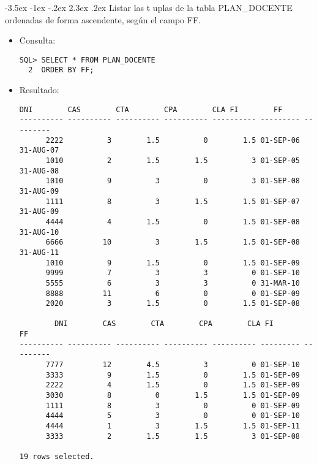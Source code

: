 \documentclass[11pt]{report}
\makeatletter
\renewcommand\chapter{\@startsection{chapter}{0}{\z@}%
    {-3.5ex \@plus -1ex \@minus -.2ex}%
    {2.3ex \@plus.2ex}%
    {\normalfont\Large\bfseries}}
\makeatother
\begin{document}
\newpage

\chapter{Listar las t uplas de la tabla PLAN\_DOCENTE ordenadas de forma ascendente, según el campo FF.}
\begin{itemize}
  \item Consulta:
  \begin{verbatim}
SQL> SELECT * FROM PLAN_DOCENTE
  2  ORDER BY FF;
  \end{verbatim}
  \item{Resultado:}
  \begin{verbatim}
DNI        CAS        CTA        CPA        CLA FI        FF             
---------- ---------- ---------- ---------- ---------- --------- ---------      
      2222          3        1.5          0        1.5 01-SEP-06 31-AUG-07      
      1010          2        1.5        1.5          3 01-SEP-05 31-AUG-08      
      1010          9          3          0          3 01-SEP-08 31-AUG-09      
      1111          8          3        1.5        1.5 01-SEP-07 31-AUG-09      
      4444          4        1.5          0        1.5 01-SEP-08 31-AUG-10      
      6666         10          3        1.5        1.5 01-SEP-08 31-AUG-11      
      1010          9        1.5          0        1.5 01-SEP-09                
      9999          7          3          3          0 01-SEP-10                
      5555          6          3          3          0 31-MAR-10                
      8888         11          6          0          0 01-SEP-09                
      2020          3        1.5          0        1.5 01-SEP-08                

        DNI        CAS        CTA        CPA        CLA FI        FF             
---------- ---------- ---------- ---------- ---------- --------- ---------      
      7777         12        4.5          3          0 01-SEP-10                
      3333          9        1.5          0        1.5 01-SEP-09                
      2222          4        1.5          0        1.5 01-SEP-09                
      3030          8          0        1.5        1.5 01-SEP-09                
      1111          8          3          0          0 01-SEP-09                
      4444          5          3          0          0 01-SEP-10                
      4444          1          3        1.5        1.5 01-SEP-11                
      3333          2        1.5        1.5          3 01-SEP-08                

19 rows selected.
  \end{verbatim}
\end{itemize}
\end{document}
